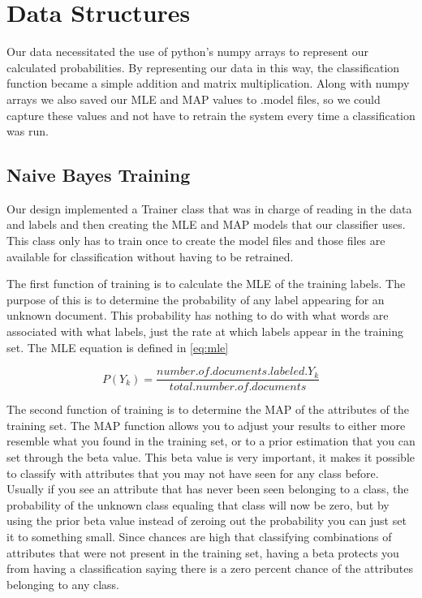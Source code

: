 \documentclass{IEEEtran}
\begin{document}
\section{Data Structures}
Our data necessitated the use of python’s numpy arrays to represent our calculated probabilities. By representing our data in this way, the classification function became a simple addition and matrix multiplication. Along with numpy arrays we also saved our MLE and MAP values to .model files, so we could capture these values and not have to retrain the system every time a classification was run.

\subsection{Naive Bayes Training}

Our design implemented a Trainer class that was in charge of reading in the data and labels and then creating the MLE and MAP models that our classifier uses. This class only has to train once to create the model files and those files are available for classification without having to be retrained. 

The first function of training is to calculate the MLE of the training labels. The purpose of this is to determine the probability of any label appearing for an unknown document. This probability has nothing to do with what words are associated with what labels, just the rate at which labels appear in the training set. The MLE equation is defined in \ref{eq:mle}

\begin{equation}
\label{eq:mle}
P(Y_k) = \dfrac{number.of.documents.labeled. Y_k}{total.number.of.documents}
\end{equation}

The second function of training is to determine the MAP of the attributes of the training set. The MAP function allows you to adjust your results to either more resemble what you found in the training set, or to a prior estimation that you can set through the beta value. This beta value is very important, it makes it possible to classify with attributes that you may not have seen for any class before. Usually if you see an attribute that has never been seen belonging to a class, the probability of the unknown class equaling that class will now be zero, but by using the prior beta value instead of zeroing out the probability you can just set it to something small. Since chances are high that classifying combinations of attributes that were not present in the training set, having a beta protects you from having a classification saying there is a zero percent chance of the attributes belonging to any class.
\end{document}
